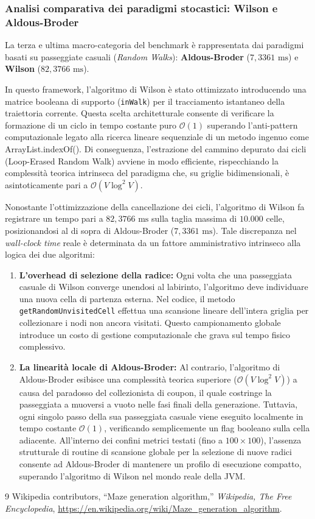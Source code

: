 \documentclass[12pt, a4paper]{article}
\begin{document}
	\subsubsection{Analisi comparativa dei paradigmi stocastici: Wilson e Aldous-Broder}
	La terza e ultima macro-categoria del benchmark è rappresentata dai paradigmi basati su passeggiate casuali (\textit{Random Walks}): \textbf{Aldous-Broder} ($7,3361\text{ ms}$) e \textbf{Wilson} ($82,3766\text{ ms}$).
	
	In questo framework, l'algoritmo di Wilson è stato ottimizzato introducendo una matrice booleana di supporto (\texttt{inWalk}) per il tracciamento istantaneo della traiettoria corrente. Questa scelta architetturale consente di verificare la formazione di un ciclo in tempo costante puro $\mathcal{O}(1)$ superando l'anti-pattern computazionale legato alla ricerca lineare sequenziale di un metodo ingenuo come ArrayList.indexOf(). Di conseguenza, l'estrazione del cammino depurato dai cicli (Loop-Erased Random Walk) avviene in modo efficiente, rispecchiando la complessità teorica intrinseca del paradigma che, su griglie bidimensionali, è asintoticamente pari a $\mathcal{O}(V \log^2 V)$.
	
	Nonostante l'ottimizzazione della cancellazione dei cicli, l'algoritmo di Wilson fa registrare un tempo pari a $82,3766\text{ ms}$ sulla taglia massima di $10.000$ celle, posizionandosi al di sopra di Aldous-Broder ($7,3361\text{ ms}$). Tale discrepanza nel \textit{wall-clock time} reale è determinata da un fattore amministrativo intrinseco alla logica dei due algoritmi:
	\begin{enumerate}
		\item \textbf{L'overhead di selezione della radice:} Ogni volta che una passeggiata casuale di Wilson converge unendosi al labirinto, l'algoritmo deve individuare una nuova cella di partenza esterna. Nel codice, il metodo \texttt{getRandomUnvisitedCell} effettua una scansione lineare dell'intera griglia per collezionare i nodi non ancora visitati. Questo campionamento globale introduce un costo di gestione computazionale che grava sul tempo fisico complessivo.
		\item \textbf{La linearità locale di Aldous-Broder:} Al contrario, l'algoritmo di Aldous-Broder esibisce una complessità teorica superiore ($\mathcal{O}(V \log^2 V)$) a causa del paradosso del collezionista di coupon, il quale costringe la passeggiata a muoversi a vuoto nelle fasi finali della generazione. Tuttavia, ogni singolo passo della sua passeggiata casuale viene eseguito localmente in tempo costante $\mathcal{O}(1)$, verificando semplicemente un flag booleano sulla cella adiacente. All'interno dei confini metrici testati (fino a $100\times100$), l'assenza strutturale di routine di scansione globale per la selezione di nuove radici consente ad Aldous-Broder di mantenere un profilo di esecuzione compatto, superando l'algoritmo di Wilson nel mondo reale della JVM.
	\end{enumerate}
	
	\newpage
	\begin{thebibliography}{9}
		Wikipedia contributors, ``Maze generation algorithm,'' \textit{Wikipedia, The Free Encyclopedia}, \url{https://en.wikipedia.org/wiki/Maze_generation_algorithm}.
	\end{thebibliography}
\end{document}
